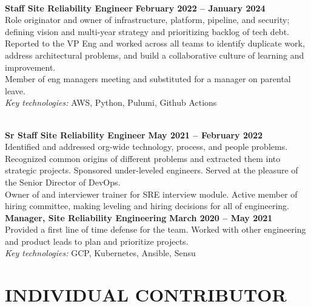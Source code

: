 \documentclass[margin,line]{resume}
\begin{document}
\begin{resume}
    \vspace{1mm}\\%
    \textbf{Staff Site Reliability Engineer} \hfill \textbf{February 2022 -- January 2024}\\
    Role originator and owner of infrastructure, platform, pipeline, and security; defining vision and multi-year strategy and prioritizing backlog of tech debt.\\
    Reported to the VP Eng and worked across all teams to identify duplicate work, address architectural problems, and build a collaborative culture of learning and improvement.\\
    Member of eng managers meeting and substituted for a manager on parental leave.\\
    \textit{Key technologies:} AWS, Python, Pulumi, Github Actions

    \vspace{1mm}\\%
    \textbf{Sr Staff Site Reliability Engineer} \hfill \textbf{May 2021 -- February 2022}\\
    Identified and addressed org-wide technology, process, and people problems. Recognized common origins of different problems and extracted them into strategic projects. Sponsored under-leveled engineers. Served at the pleasure of the Senior Director of DevOps.\\
    Owner of and interviewer trainer for SRE interview module.  Active member of hiring committee, making leveling and hiring decisions for all of engineering.\vspace{1mm}\\
    \textbf{Manager, Site Reliability Engineering} \hfill \textbf{March 2020 -- May 2021}\\
    Provided a first line of time defense for the team.  Worked with other engineering and product leads to plan and prioritize projects.\vspace{1mm}\\
    \textit{Key technologies:} GCP, Kubernetes, Ansible, Sensu

\pagebreak
\sectionline
    \section{\mysidestyle \textbf{\large{I}\small{NDIVIDUAL} \large{C}\small{ONTRIBUTOR}}}


\end{resume}
\end{document}
